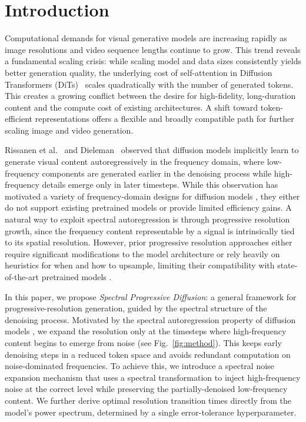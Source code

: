 \section{Introduction}
\label{sec:intro}


Computational demands for visual generative models are increasing rapidly as image resolutions and video sequence lengths continue to grow. This trend reveals a fundamental scaling crisis: while scaling model and data sizes consistently yields better generation quality, the underlying cost of self-attention in Diffusion Transformers (DiTs)~\citep{dit} scales quadratically with the number of generated tokens. This creates a growing conflict between the desire for high-fidelity, long-duration content and the compute cost of existing architectures. A shift toward token-efficient representations offers a flexible and broadly compatible path for further scaling image and video generation.

Rissanen et al.~\citep{rissanen2023generative} and Dieleman~\citep{dieleman2024spectral} observed that diffusion models implicitly learn to generate visual content autoregressively in the frequency domain, where low-frequency components are generated earlier in the denoising process while high-frequency details emerge only in later timesteps.  While this observation has motivated a variety of frequency-domain designs for diffusion models \cite{wavediff, spectral-reg, fourierspace, frecas}, they either do not support existing pretrained models or provide limited efficiency gains. A natural way to exploit spectral autoregression is through progressive resolution growth, since the frequency content representable by a signal is intrinsically tied to its spatial resolution. However, prior progressive resolution approaches \cite{pyrflow, scalespace, ralu, lssgen} either require significant modifications to the model architecture or rely heavily on heuristics for when and how to upsample, limiting their compatibility with state-of-the-art pretrained models \cite{zimage, flux-2, wan, cogvideox}.

In this paper, we propose \emph{Spectral Progressive Diffusion}: a general framework for progressive-resolution generation, guided by the spectral structure of the denoising process. Motivated by the spectral autoregression property of diffusion models \cite{dieleman2024spectral}, we expand the resolution only at the timesteps where high-frequency content begins to emerge from noise (see Fig.~\ref{fig:method}). This keeps early denoising steps in a reduced token space and avoids redundant computation on noise-dominated frequencies. 
To achieve this, we introduce a spectral noise expansion mechanism that uses a spectral transformation to inject high-frequency noise at the correct level while preserving the partially-denoised low-frequency content. We further derive optimal resolution transition times directly from the model's power spectrum, determined by a single error-tolerance hyperparameter. 

